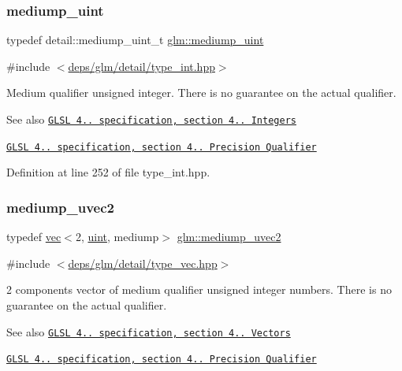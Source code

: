 \subsubsection{\texorpdfstring{mediump\+\_\+uint}{mediump\_uint}}
{\footnotesize\ttfamily typedef detail\+::mediump\+\_\+uint\+\_\+t \hyperlink{group__core__precision_ga08ae38ad78ade3539fdd1d25052b8c51}{glm\+::mediump\+\_\+uint}}



{\ttfamily \#include $<$\hyperlink{type__int_8hpp}{deps/glm/detail/type\+\_\+int.\+hpp}$>$}

Medium qualifier unsigned integer. There is no guarantee on the actual qualifier.

\begin{DoxySeeAlso}{See also}
\href{http://www.opengl.org/registry/doc/GLSLangSpec.4.20.8.pdf}{\tt G\+L\+SL 4.. specification, section 4.. Integers} 

\href{http://www.opengl.org/registry/doc/GLSLangSpec.4.20.8.pdf}{\tt G\+L\+SL 4.. specification, section 4.. Precision Qualifier} 
\end{DoxySeeAlso}


Definition at line 252 of file type\+\_\+int.\+hpp.

\mbox{\label{group__core__precision_ga35052256be4d47b9cb80114ca043cfaf}} 
\subsubsection{\texorpdfstring{mediump\+\_\+uvec2}{mediump\_uvec2}}
{\footnotesize\ttfamily typedef \hyperlink{structglm_1_1vec}{vec}$<$2, \hyperlink{group__core__precision_ga4fd29415871152bfb5abd588334147c8}{uint}, mediump$>$ \hyperlink{group__core__precision_ga35052256be4d47b9cb80114ca043cfaf}{glm\+::mediump\+\_\+uvec2}}



{\ttfamily \#include $<$\hyperlink{type__vec_8hpp}{deps/glm/detail/type\+\_\+vec.\+hpp}$>$}

2 components vector of medium qualifier unsigned integer numbers. There is no guarantee on the actual qualifier.

\begin{DoxySeeAlso}{See also}
\href{http://www.opengl.org/registry/doc/GLSLangSpec.4.20.8.pdf}{\tt G\+L\+SL 4.. specification, section 4.. Vectors} 

\href{http://www.opengl.org/registry/doc/GLSLangSpec.4.20.8.pdf}{\tt G\+L\+SL 4.. specification, section 4.. Precision Qualifier} 
\end{DoxySeeAlso}


